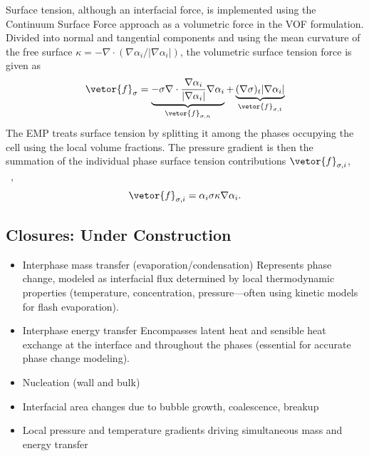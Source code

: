 Surface tension, although an interfacial force, is implemented using the 
 Continuum Surface Force approach as a volumetric force in the VOF formulation.
 Divided into normal and tangential components and using the mean 
 curvature of the free surface 
 $\kappa = - \nabla \cdot \left(\nabla \alpha_{i}/|\nabla \alpha_{i}|\right)$,
 the volumetric surface tension force is given as 
 \begin{equation}
    \vetor{f}_{\sigma} = \underbrace{-\sigma \nabla \cdot \frac{\nabla \alpha_{i}}{|\nabla \alpha_{i}|} \nabla \alpha_{i}}_{\vetor{f}_{\sigma,n}}
     + \underbrace{(\nabla \sigma)_{t}|\nabla \alpha_{i}|}_{\vetor{f}_{\sigma,t}}
 \end{equation}
 The EMP treats surface tension by splitting it among the phases occupying
 the cell using the local volume fractions. The pressure gradient
 is then the summation of the 
 individual phase surface tension contributions $\vetor{f}_{\sigma, i}$,~\cite{gadaLargeScaleInterface2017} ~,
 \begin{equation}
    \vetor{f}_{\sigma, i} = \alpha_{i} \sigma \kappa \nabla \alpha_{i}.
 \end{equation}

\subsection{Closures: Under Construction}
\begin{itemize}
    \item Interphase mass transfer (evaporation/condensation)
     Represents phase change, modeled as interfacial flux determined
by local thermodynamic properties (temperature, concentration, pressure—often
using kinetic models for flash evaporation).
    \item Interphase energy transfer
     Encompasses latent heat and sensible heat exchange at the interface 
and throughout the phases (essential for accurate phase change modeling).
    \item Nucleation (wall and bulk)
    \item Interfacial area changes due to bubble growth, coalescence, breakup
    \item Local pressure and temperature gradients driving simultaneous mass and energy transfer
\end{itemize}

